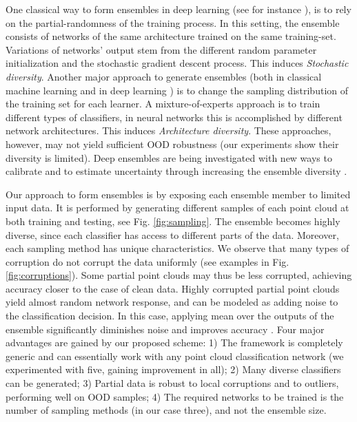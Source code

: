 \documentclass[10pt,twocolumn]{article}
\begin{document}
One classical way to form ensembles in deep learning (see for instance \cite{lakshminarayanan2017simple}), is to rely on the partial-randomness of the training process. In this setting, the ensemble consists of networks of the same architecture  trained on the same training-set. Variations of networks' output stem from the different random parameter initialization and the stochastic gradient descent process. This induces \emph{Stochastic diversity}.
Another major approach to generate ensembles (both in classical machine learning and in deep learning \cite{adaboost,lakshminarayanan2017simple,zefrehi2020imbalance}) is to change the sampling distribution of the training set for each learner. A mixture-of-experts approach is to 
train different types of classifiers, in neural networks this is accomplished by different network architectures. This induces \emph{Architecture diversity}. 
These approaches, however, may not yield sufficient OOD robustness (our experiments show their diversity is limited).
Deep ensembles are being investigated with new ways to calibrate and to estimate uncertainty through increasing the ensemble diversity \cite{zaidi2021neural, uncertainty3d}.

Our approach to form ensembles is by exposing each ensemble member to limited input data. It is performed by generating different samples of each point cloud at both training and testing,
see Fig. \ref{fig:sampling}.
The ensemble becomes highly diverse, since each classifier has access to different parts of the data. Moreover, each sampling method has unique  characteristics. We observe that many types of corruption do not corrupt the data uniformly (see examples in Fig. \ref{fig:corruptions}). Some partial point clouds may thus be less corrupted, achieving accuracy closer to the case of clean data. Highly corrupted partial point clouds yield almost random network response, and can be modeled as adding noise to the classification decision. In this case, applying mean over the outputs of the ensemble significantly diminishes noise and improves accuracy . 
Four major advantages are gained by our proposed scheme:
1) The framework is completely generic and can essentially work with any point cloud classification network (we experimented with five, gaining improvement in all);
2) Many diverse classifiers can be generated;
3) Partial data is robust to local corruptions  and to outliers, performing well on OOD samples;
4) The required networks to be trained is the number of sampling methods (in our case three), and not the ensemble size.
\end{document}
